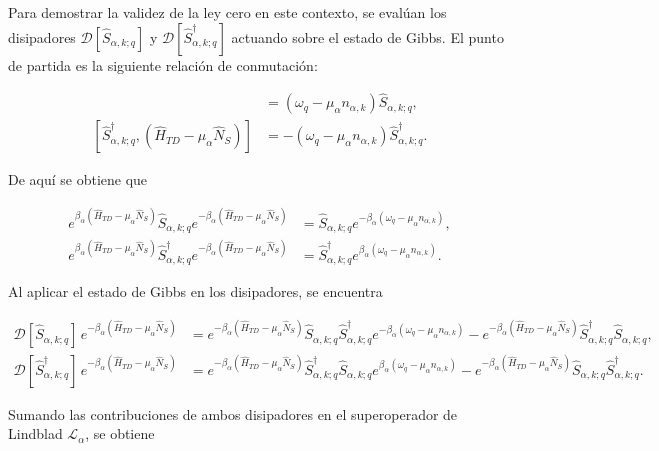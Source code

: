 \begin{appendixs}
Para demostrar la validez de la ley cero en este contexto, se evalúan los disipadores $\mathcal{D}[\hat{S}_{\alpha,k;q}]$ y $\mathcal{D}[\hat{S}^{\dagger}_{\alpha,k;q}]$ actuando sobre el estado de Gibbs. El punto de partida es la siguiente relación de conmutación:

\begin{align*}
    [\hat{S}_{\alpha,k;q},(\hat{H}_{TD} - \mu_{\alpha}\hat{N}_{S})] & = (\omega_{q} - \mu_{\alpha}n_{\alpha,k})\hat{S}_{\alpha,k;q},  \\
    [\hat{S}^{\dagger}_{\alpha,k;q},(\hat{H}_{TD} - \mu_{\alpha}\hat{N}_{S})] & = -(\omega_{q} - \mu_{\alpha}n_{\alpha,k})\hat{S}^{\dagger}_{\alpha,k;q}.
\end{align*}

De aquí se obtiene que

\begin{align*}
    e^{\beta_{\alpha}(\hat{H}_{TD} - \mu_{\alpha}\hat{N}_{S})}\hat{S}_{\alpha,k;q} e^{-\beta_{\alpha}(\hat{H}_{TD} - \mu_{\alpha}\hat{N}_{S})} & = \hat{S}_{\alpha,k;q}e^{-\beta_{\alpha}(\omega_{q} - \mu_{\alpha}n_{\alpha,k})}, \\
    e^{\beta_{\alpha}(\hat{H}_{TD} - \mu_{\alpha}\hat{N}_{S})}\hat{S}^{\dagger}_{\alpha,k;q} e^{-\beta_{\alpha}(\hat{H}_{TD} - \mu_{\alpha}\hat{N}_{S})} & = \hat{S}^{\dagger}_{\alpha,k;q}e^{\beta_{\alpha}(\omega_{q} - \mu_{\alpha}n_{\alpha,k})}.
\end{align*}

Al aplicar el estado de Gibbs en los disipadores, se encuentra

\begin{align*}
    \mathcal{D}[\hat{S}_{\alpha,k;q}]\,e^{-\beta_{\alpha}(\hat{H}_{TD} - \mu_{\alpha}\hat{N}_{S})} & =  e^{-\beta_{\alpha}(\hat{H}_{TD} - \mu_{\alpha}\hat{N}_{S})} \hat{S}_{\alpha,k;q}\hat{S}^{\dagger}_{\alpha,k;q} e^{-\beta_{\alpha}(\omega_{q} - \mu_{\alpha}n_{\alpha,k})} - e^{-\beta_{\alpha}(\hat{H}_{TD} - \mu_{\alpha}\hat{N}_{S})} \hat{S}^{\dagger}_{\alpha,k;q}\hat{S}_{\alpha,k;q}, \\
    \mathcal{D}[\hat{S}^{\dagger}_{\alpha,k;q}]\,e^{-\beta_{\alpha}(\hat{H}_{TD} - \mu_{\alpha}\hat{N}_{S})} & = e^{-\beta_{\alpha}(\hat{H}_{TD} - \mu_{\alpha}\hat{N}_{S})} \hat{S}^{\dagger}_{\alpha,k;q}\hat{S}_{\alpha,k;q} e^{\beta_{\alpha}(\omega_{q} - \mu_{\alpha}n_{\alpha,k})} - e^{-\beta_{\alpha}(\hat{H}_{TD} - \mu_{\alpha}\hat{N}_{S})} \hat{S}_{\alpha,k;q}\hat{S}^{\dagger}_{\alpha,k;q}. 
\end{align*}

Sumando las contribuciones de ambos disipadores en el superoperador de Lindblad $\mathcal{L}_{\alpha}$, se obtiene


\end{appendixs}
